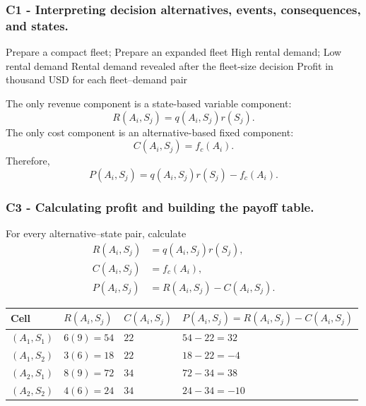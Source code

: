 \subsubsection*{C1 - Interpreting decision alternatives, events, consequences, and states.}
\label{subsec:problem6-event-equipment-fleet-c1}

\DecisionElementsTable
{Prepare a compact fleet; Prepare an expanded fleet}
{High rental demand; Low rental demand}
{Rental demand revealed after the fleet-size decision}
{Profit in thousand USD for each fleet--demand pair}

The only revenue component is a state-based variable component:
\[
R(A_i,S_j)=q(A_i,S_j)r(S_j).
\]
The only cost component is an alternative-based fixed component:
\[
C(A_i,S_j)=f_c(A_i).
\]
Therefore,
\[
P(A_i,S_j)
=
q(A_i,S_j)r(S_j)
-
f_c(A_i).
\]


\subsubsection*{C3 - Calculating profit and building the payoff table.}
\label{subsec:problem6-event-equipment-fleet-c3}

For every alternative--state pair, calculate
\[
\begin{aligned}
	R(A_i,S_j)&=q(A_i,S_j)r(S_j),
	\\
	C(A_i,S_j)&=f_c(A_i),
	\\
	P(A_i,S_j)&=R(A_i,S_j)-C(A_i,S_j).
\end{aligned}
\]

\begin{center}
	\small
	\begin{tabular}{llll}
		\toprule
		Cell
		& \(R(A_i,S_j)\)
		& \(C(A_i,S_j)\)
		& \(P(A_i,S_j)=R(A_i,S_j)-C(A_i,S_j)\) \\
		\midrule
		\((A_1,S_1)\)
		& \(6(9)=54\)
		& \(22\)
		& \(54-22=32\) \\
		
		\((A_1,S_2)\)
		& \(3(6)=18\)
		& \(22\)
		& \(18-22=-4\) \\
		
		\((A_2,S_1)\)
		& \(8(9)=72\)
		& \(34\)
		& \(72-34=38\) \\
		
		\((A_2,S_2)\)
		& \(4(6)=24\)
		& \(34\)
		& \(24-34=-10\) \\
		\bottomrule
	\end{tabular}
\end{center}

